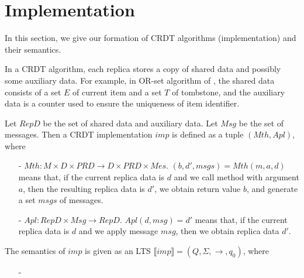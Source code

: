 
\section{Implementation}
\label{sec:implementation}

In this section, we give our formation of CRDT algorithms (implementation) and their semantics. 

In a CRDT algorithm, each replica stores a copy of shared data and possibly some auxiliary data. For example, in OR-set algorithm of \cite{Bieniusa:2012}, the shared data consists of a set $E$ of current item and a set $T$ of tombstone, and the auxiliary data is a counter used to ensure the uniqueness of item identifier.

Let $RepD$ be the set of shared data and auxiliary data. Let $Msg$ be the set of messages. Then a CRDT implementation $imp$ is defined as a tuple $(Mth,Apl)$, where 

\begin{itemize}
\setlength{\itemsep}{0.5pt}
\item[-] $Mth: M \times D \times PRD \rightarrow D \times PRD \times Mes$. $(b,d',msgs) = Mth(m,a,d)$ means that, if the current replica data is $d$ and we call method with argument $a$, then the resulting replica data is $d'$, we obtain return value $b$, and generate a set $msgs$ of messages. 

\item[-] $Apl: RepD \times Msg \rightarrow RepD$. $Apl(d,msg) = d'$ means that, if the current replica data is $d$ and we apply message $msg$, then we obtain replica data $d'$. 
\end{itemize} 

The semantics of $imp$ is given as an LTS $\llbracket imp \rrbracket = (Q,\Sigma,\rightarrow,q_0)$, where 

\begin{itemize}
\setlength{\itemsep}{0.5pt}
\item[-] 
\end{itemize}


